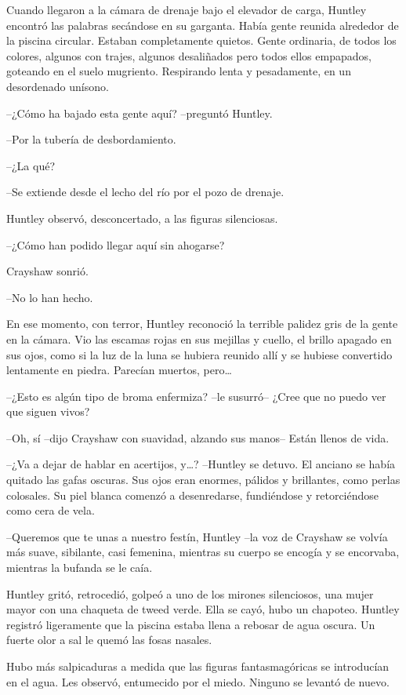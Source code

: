 {Cuando llegaron a la cámara de drenaje bajo el elevador de carga,
 Huntley encontró las palabras secándose en su garganta. Había gente
 reunida alrededor de la piscina circular. Estaban completamente quietos.
 Gente ordinaria, de todos los colores, algunos con trajes, algunos
 desaliñados pero todos ellos empapados, goteando en el suelo mugriento.
Respirando lenta y pesadamente, en un desordenado unísono.}

{--¿Cómo ha bajado esta gente aquí? --preguntó Huntley.}

{--Por la tubería de desbordamiento.}

{--¿La qué?}

{--Se extiende desde el lecho del río por el pozo de drenaje.}

{Huntley observó, desconcertado, a las figuras silenciosas.}

{--¿Cómo han podido llegar aquí sin ahogarse?}

{Crayshaw sonrió.}

{--No lo han hecho.}

{En ese momento, con terror, Huntley reconoció la terrible palidez gris
 de la gente en la cámara. Vio las escamas rojas en sus mejillas y
 cuello, el brillo apagado en sus ojos, como si la luz de la luna se
 hubiera reunido allí y se hubiese convertido lentamente en piedra.
 Parecían muertos, pero\ldots{}}

{--¿Esto es algún tipo de broma enfermiza? --le susurró-- ¿Cree que no
puedo ver que siguen vivos?}

{--Oh, sí --dijo Crayshaw con suavidad, alzando sus manos-- Están llenos
de vida.}

{--¿Va a dejar de hablar en acertijos, y\ldots{}? --Huntley se detuvo.
 El anciano se había quitado las gafas oscuras. Sus ojos eran enormes,
 pálidos y brillantes, como perlas colosales. Su piel blanca comenzó a
desenredarse, fundiéndose y retorciéndose como cera de vela.}

{--Queremos que te unas a nuestro festín, Huntley --la voz de Crayshaw
 se volvía más suave, sibilante, casi femenina, mientras su cuerpo se
encogía y se encorvaba, mientras la bufanda se le caía.}

{Huntley gritó, retrocedió, golpeó a uno de los mirones silenciosos, una
 mujer mayor con una chaqueta de tweed verde. Ella se cayó, hubo un
 chapoteo. Huntley registró ligeramente que la piscina estaba llena a
 rebosar de agua oscura. Un fuerte olor a sal le quemó las fosas
nasales.}

{Hubo más salpicaduras a medida que las figuras fantasmagóricas se
 introducían en el agua. Les observó, entumecido por el miedo. Ninguno se
levantó de nuevo.}

